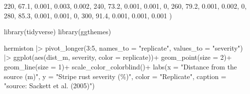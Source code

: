 \documentclass[
  letterpaper,
  DIV=11,
  numbers=noendperiod]{scrreprt}
\newenvironment{Shaded}{\begin{snugshade}}{\end{snugshade}}
\newcommand{\AttributeTok}[1]{\textcolor[rgb]{0.40,0.45,0.13}{#1}}
\newcommand{\DecValTok}[1]{\textcolor[rgb]{0.68,0.00,0.00}{#1}}
\newcommand{\FloatTok}[1]{\textcolor[rgb]{0.68,0.00,0.00}{#1}}
\newcommand{\FunctionTok}[1]{\textcolor[rgb]{0.28,0.35,0.67}{#1}}
\newcommand{\NormalTok}[1]{\textcolor[rgb]{0.00,0.23,0.31}{#1}}
\newcommand{\SpecialCharTok}[1]{\textcolor[rgb]{0.37,0.37,0.37}{#1}}
\newcommand{\StringTok}[1]{\textcolor[rgb]{0.13,0.47,0.30}{#1}}
\begin{document}
\begin{Shaded}
\begin{Highlighting}[]
  \DecValTok{220}\NormalTok{,   }\FloatTok{67.1}\NormalTok{, }\FloatTok{0.001}\NormalTok{, }\FloatTok{0.003}\NormalTok{, }\FloatTok{0.002}\NormalTok{,}
  \DecValTok{240}\NormalTok{,   }\FloatTok{73.2}\NormalTok{, }\FloatTok{0.001}\NormalTok{, }\FloatTok{0.001}\NormalTok{,     }\DecValTok{0}\NormalTok{,}
  \DecValTok{260}\NormalTok{,   }\FloatTok{79.2}\NormalTok{, }\FloatTok{0.001}\NormalTok{, }\FloatTok{0.002}\NormalTok{,     }\DecValTok{0}\NormalTok{,}
  \DecValTok{280}\NormalTok{,   }\FloatTok{85.3}\NormalTok{, }\FloatTok{0.001}\NormalTok{, }\FloatTok{0.001}\NormalTok{,     }\DecValTok{0}\NormalTok{,}
  \DecValTok{300}\NormalTok{,   }\FloatTok{91.4}\NormalTok{, }\FloatTok{0.001}\NormalTok{, }\FloatTok{0.001}\NormalTok{, }\FloatTok{0.001}
\NormalTok{  )}
\end{Highlighting}
\end{Shaded}

\begin{Shaded}
\begin{Highlighting}[]
\FunctionTok{library}\NormalTok{(tidyverse)}
\FunctionTok{library}\NormalTok{(ggthemes)}

\NormalTok{hermiston }\SpecialCharTok{|\textgreater{}} 
  \FunctionTok{pivot\_longer}\NormalTok{(}\DecValTok{3}\SpecialCharTok{:}\DecValTok{5}\NormalTok{, }\AttributeTok{names\_to =} \StringTok{"replicate"}\NormalTok{, }\AttributeTok{values\_to =} \StringTok{"severity"}\NormalTok{) }\SpecialCharTok{|\textgreater{}} 
  \FunctionTok{ggplot}\NormalTok{(}\FunctionTok{aes}\NormalTok{(dist\_m, severity, }\AttributeTok{color =}\NormalTok{ replicate))}\SpecialCharTok{+}
  \FunctionTok{geom\_point}\NormalTok{(}\AttributeTok{size =} \DecValTok{2}\NormalTok{)}\SpecialCharTok{+}
  \FunctionTok{geom\_line}\NormalTok{(}\AttributeTok{size =} \DecValTok{1}\NormalTok{)}\SpecialCharTok{+}
  \FunctionTok{scale\_color\_colorblind}\NormalTok{()}\SpecialCharTok{+}
  \FunctionTok{labs}\NormalTok{(}\AttributeTok{x =} \StringTok{"Distance from the source (m)"}\NormalTok{,}
       \AttributeTok{y =} \StringTok{"Stripe rust severity (\%)"}\NormalTok{,}
       \AttributeTok{color =} \StringTok{"Replicate"}\NormalTok{,}
       \AttributeTok{caption =} \StringTok{"source: Sackett et al. (2005)"}\NormalTok{)}
\end{Highlighting}
\end{Shaded}
\end{document}
